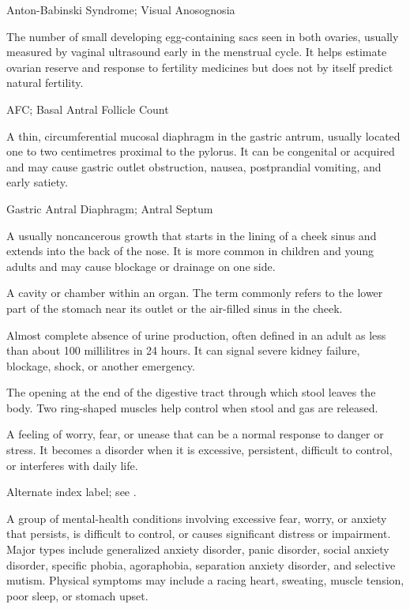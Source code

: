 \synonyms
Anton-Babinski Syndrome; Visual Anosognosia

 The number of small developing egg-containing sacs seen in both ovaries, usually measured by vaginal ultrasound early in the menstrual cycle. It helps estimate ovarian reserve and response to fertility medicines but does not by itself predict natural fertility.

\synonyms
AFC; Basal Antral Follicle Count

 A thin, circumferential mucosal diaphragm in the gastric antrum, usually located one to two centimetres proximal to the pylorus. It can be congenital or acquired and may cause gastric outlet obstruction, nausea, postprandial vomiting, and early satiety.

\synonyms
Gastric Antral Diaphragm; Antral Septum

 A usually noncancerous growth that starts in the lining of a cheek sinus and extends into the back of the nose. It is more common in children and young adults and may cause blockage or drainage on one side.

 A cavity or chamber within an organ. The term commonly refers to the lower part of the stomach near its outlet or the air-filled sinus in the cheek.

 Almost complete absence of urine production, often defined in an adult as less than about 100 millilitres in 24 hours. It can signal severe kidney failure, blockage, shock, or another emergency.

 The opening at the end of the digestive tract through which stool leaves the body. Two ring-shaped muscles help control when stool and gas are released.

 A feeling of worry, fear, or unease that can be a normal response to danger or stress. It becomes a disorder when it is excessive, persistent, difficult to control, or interferes with daily life.

 Alternate index label; see .

 A group of mental-health conditions involving excessive fear, worry, or anxiety that persists, is difficult to control, or causes significant distress or impairment. Major types include generalized anxiety disorder, panic disorder, social anxiety disorder, specific phobia, agoraphobia, separation anxiety disorder, and selective mutism. Physical symptoms may include a racing heart, sweating, muscle tension, poor sleep, or stomach upset.


